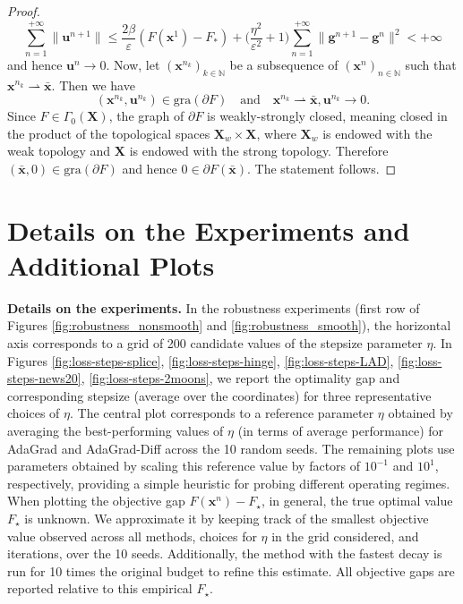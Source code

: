 \documentclass[11pt]{article}
\theoremstyle{plain}
\theoremstyle{definition}
\theoremstyle{remark}
\newcommand{\norm}[1]{\lVert{#1}\rVert}
\newcommand{\bHH}{\bm{X}}
\newcommand{\bx}{\bm{x}}
\newcommand{\buu}{\bm{g}}
\newcommand{\iter}{n}
\newcommand{\N}{\mathbb{N}}
\begin{document}
\begin{proof}
\begin{equation*}
 \sum_{\iter=1}^{+\infty} \norm{\bm{u}^{\iter+1}} \leq \frac{2\beta}{\varepsilon}(F(\bx^1)- F_*)
 + \bigg( \frac{\eta^2}{\varepsilon^2} + 1\bigg)\sum_{\iter=1}^{+\infty} \norm{\buu^{\iter+1} - \buu^{\iter}}^2<+\infty
 \end{equation*}
 and hence $\bm{u}^{\iter}\to 0$. Now, let $(\bx^{\iter_k})_{k\in \N}$ be a subsequence of
 $(\bx^\iter)_{\iter\in \N}$ such that $\bx^{\iter_k} \rightharpoonup \bar{\bx}$. Then we have
 \begin{equation*}
 (\bx^{\iter_k}, \bm{u}^{\iter_k}) \in \mathrm{gra}(\partial F)\quad\text{and}\quad
 \bx^{\iter_k} \rightharpoonup \bar{\bx},  \bm{u}^{\iter_k} \to 0.
 \end{equation*}
 Since $F\in \Gamma_0(\bHH)$, the graph of $\partial F$ is weakly-strongly closed, meaning closed in the product of the topological spaces $\bHH_w\times \bHH$, where $\bHH_w$ is endowed with the weak topology and $\bHH$ is endowed with the strong topology.  Therefore $(\bar{\bx},0)\in \mathrm{gra}(\partial F)$ and hence $0\in \partial F(\bar{\bx})$. The statement follows.
\end{proof}
\section{Details on the Experiments and Additional Plots}\label{B}
\textbf{Details on the experiments.}
In the robustness experiments (first row of Figures \ref{fig:robustness_nonsmooth} and \ref{fig:robustness_smooth}), the horizontal axis corresponds to a grid of 200 candidate values of the stepsize parameter $\eta$.
In  Figures \ref{fig:loss-steps-splice}, \ref{fig:loss-steps-hinge}, \ref{fig:loss-steps-LAD}, \ref{fig:loss-steps-news20}, \ref{fig:loss-steps-2moons}, we report the optimality gap and corresponding stepsize (average over the coordinates) for three representative choices of $\eta.$ The central plot corresponds to a reference parameter $\eta$ obtained by averaging the best-performing values of $\eta$ (in terms of average performance) for AdaGrad and AdaGrad-Diff across the 10 random seeds.  The remaining plots use parameters obtained by scaling this reference value by factors of $10^{-1}$ and $10^{1}$, respectively, providing a simple heuristic for probing different operating regimes.\\

\noindent
When plotting the objective gap $F(\bx^\iter) - F_\star$, in general, the true optimal value $F_\star$ is unknown. We approximate it by keeping track of the smallest objective value observed across all methods, choices for $\eta$ in the grid considered, and iterations, over the 10 seeds. Additionally, the method with the fastest decay is run for 10 times the original budget to refine this estimate. All objective gaps are reported relative to this empirical $F_\star$.\\
\end{document}
